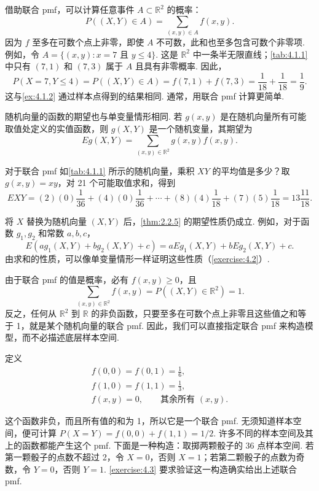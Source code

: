 借助联合 pmf，可以计算任意事件 $A\subset\mathbb R^2$ 的概率：
$$P((X,Y)\in A)=\sum_{(x,y)\in A}f(x,y).$$
因为 $f$ 至多在可数个点上非零，即使 $A$ 不可数，此和也至多包含可数个非零项. 例如，令 $A=\{(x,y):x=7\text{ 且 }y\le4\}$. 这是 $\mathbb R^2$ 中一条半无限直线；\autoref{tab:4.1.1} 中只有 $(7,1)$ 和 $(7,3)$ 属于 $A$ 且具有非零概率. 因此，
$$
P(X=7,Y\le4)=P((X,Y)\in A)=f(7,1)+f(7,3)=\frac1{18}+\frac1{18}=\frac19.
$$
这与\autoref{ex:4.1.2} 通过样本点得到的结果相同. 通常，用联合 pmf 计算更简单.

随机向量的函数的期望也与单变量情形相同. 若 $g(x,y)$ 是在随机向量所有可能取值处定义的实值函数，则 $g(X,Y)$ 是一个随机变量，其期望为
$$Eg(X,Y)=\sum_{(x,y)\in\mathbb R^2}g(x,y)f(x,y).$$
\begin{example}[续\autoref{ex:4.1.2}]\label{ex:4.1.4}
对于联合 pmf 如\autoref{tab:4.1.1} 所示的随机向量，乘积 $XY$ 的平均值是多少？取 $g(x,y)=xy$，对 21 个可能取值求和，得到
$$
EXY=(2)(0)\frac1{36}+(4)(0)\frac1{36}+\cdots+(8)(4)\frac1{18}+(7)(5)\frac1{18}=13\frac{11}{18}.
$$
\end{example}
将 $X$ 替换为随机向量 $(X,Y)$ 后，\autoref{thm:2.2.5} 的期望性质仍成立. 例如，对于函数 $g_1,g_2$ 和常数 $a,b,c$，
$$E(ag_1(X,Y)+bg_2(X,Y)+c)=aEg_1(X,Y)+bEg_2(X,Y)+c.$$
由求和的性质，可以像单变量情形一样证明这些性质（\autoref{exercise:4.2}）.

由于联合 pmf 的值是概率，必有 $f(x,y)\ge0$，且
$$\sum_{(x,y)\in\mathbb R^2}f(x,y)=P((X,Y)\in\mathbb R^2)=1.$$
反之，任何从 $\mathbb R^2$ 到 $\mathbb R$ 的非负函数，只要至多在可数个点上非零且这些值之和等于 1，就是某个随机向量的联合 pmf. 因此，我们可以直接指定联合 pmf 来构造模型，而不必描述底层样本空间.
\begin{example}\label{ex:4.1.5}
定义
$$
\begin{gathered}
f(0,0)=f(0,1)=\frac16,\\
f(1,0)=f(1,1)=\frac13,\\
f(x,y)=0,\qquad\text{其余所有 }(x,y).
\end{gathered}
$$

这个函数非负，而且所有值的和为 1，所以它是一个联合 pmf. 无须知道样本空间，便可计算 $P(X=Y)=f(0,0)+f(1,1)=1/2$. 许多不同的样本空间及其上的函数都能产生这个 pmf. 下面是一种构造：取掷两颗骰子的 36 点样本空间. 若第一颗骰子的点数不超过 2，令 $X=0$，否则 $X=1$；若第二颗骰子的点数为奇数，令 $Y=0$，否则 $Y=1$. \autoref{exercise:4.3} 要求验证这一构造确实给出上述联合 pmf.
\end{example}

